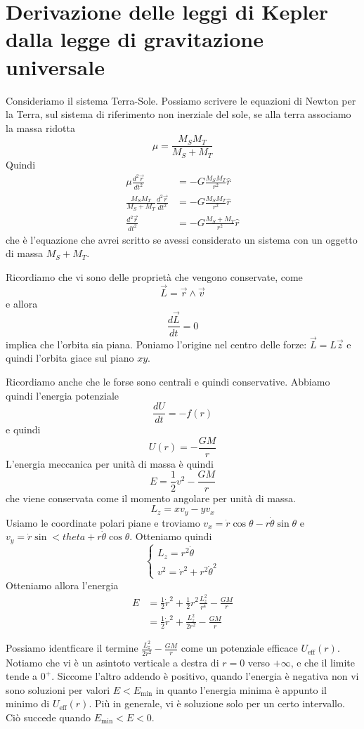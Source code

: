 \documentclass[a4paper]{article}
\begin{document}
\section{Derivazione delle leggi di Kepler dalla legge di gravitazione universale}

Consideriamo il sistema Terra-Sole.
Possiamo scrivere le equazioni di Newton per la Terra, sul sistema di riferimento
non inerziale del sole, se alla terra associamo la massa ridotta
\[
    \mu = \frac{M_S M_T}{M_S + M_T}
\]
Quindi
\begin{align*}
    \mu \frac{d^2\vec{r}}{dt^2} &= - G \frac{M_S M_T}{r^2} \hat{r} \\
    \frac{M_S M_T}{M_S + M_T} \frac{d^2\vec{r}}{dt^2} &= - G \frac{M_S M_T}{r^2} \hat{r} \\
    \frac{d^2\vec{r}}{dt^2} &= - G \frac{M_S + M_T}{r^2} \hat{r}
\end{align*}
che è l'equazione che avrei scritto se avessi considerato un sistema
con un oggetto di massa \(M_S + M_T\).

Ricordiamo che vi sono delle proprietà che vengono conservate, come
\[
    \vec{L} = \vec{r} \wedge \vec{v}
\]
e allora
\[
    \frac{d\vec{L}}{dt} = 0
\]
implica che l'orbita sia piana.
Poniamo l'origine nel centro delle forze: \(\vec{L} = L\vec{z}\)
e quindi l'orbita giace sul piano \(xy\).

Ricordiamo anche che le forse sono centrali e quindi conservative.
Abbiamo quindi l'energia potenziale
\[
    \frac{dU}{dt} = -f(r)
\]
e quindi
\[
    U(r) = - \frac{GM}{r}
\]
L'energia meccanica per unità di massa è quindi
\[
    E = \frac{1}{2} v^2 - \frac{GM}{r}
\]
che viene conservata come il momento angolare per unità di massa.
\[
    L_z = x v_y - y v_x
\]
Usiamo le coordinate polari piane
e troviamo \(v_x = \dot{r}\cos\theta - r\dot{\theta}\sin\theta\)
e \(v_y = \dot{r}\sin<theta + r\dot{\theta}\cos\theta\).
Otteniamo quindi
\[
    \begin{cases}
        L_z = r^2 \dot{\theta} \\
        v^2 = \dot{r}^2 + r^2 \dot{\theta}^2
    \end{cases}
\]
Otteniamo allora l'energia
\begin{align*}
    E &= \frac{1}{2} \dot{r}^2 + \frac{1}{2}r^2 \frac{L_z^2}{r^4} - \frac{GM}{r} \\
      &= \frac{1}{2} \dot{r}^2 + \frac{L_z^2}{2r^2} - \frac{GM}{r}
\end{align*}

Possiamo identficare il termine \(\frac{L_z^2}{2r^2} - \frac{GM}{r}\)
come un potenziale efficace \(U_\text{eff}(r)\).
Notiamo che vi è un asintoto verticale a destra di \(r=0\) verso \(+\infty\),
e che il limite tende a \(0^+\).
Siccome l'altro addendo è positivo, quando l'energia è negativa
non vi sono soluzioni per valori \(E < E_\text{min}\)
in quanto l'energia minima è appunto il minimo di \(U_\text{eff}(r)\).
Più in generale, vi è soluzione solo per un certo
intervallo. Ciò succede quando \(E_\text{min} < E < 0\). %
\end{document}
